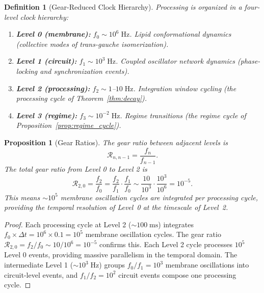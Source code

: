\documentclass[twocolumn,10pt]{article}
\newtheorem{proposition}[theorem]{Proposition}
\newtheorem{definition}[theorem]{Definition}
\theoremstyle{remark}
\begin{document}
\begin{definition}[Gear-Reduced Clock Hierarchy]
\label{def:clock}
Processing is organized in a four-level clock hierarchy:
\begin{enumerate}
\item \textbf{Level 0 (membrane):} $f_0 \sim 10^6\;\mathrm{Hz}$. Lipid conformational dynamics (collective modes of trans-gauche isomerization).
\item \textbf{Level 1 (circuit):} $f_1 \sim 10^3\;\mathrm{Hz}$. Coupled oscillator network dynamics (phase-locking and synchronization events).
\item \textbf{Level 2 (processing):} $f_2 \sim 1$--$10\;\mathrm{Hz}$. Integration window cycling (the processing cycle of Theorem~\ref{thm:decay}).
\item \textbf{Level 3 (regime):} $f_3 \sim 10^{-2}\;\mathrm{Hz}$. Regime transitions (the regime cycle of Proposition~\ref{prop:regime_cycle}).
\end{enumerate}
\end{definition}

\begin{proposition}[Gear Ratios]
\label{prop:gear}
The gear ratio between adjacent levels is
\begin{equation}
\mathcal{R}_{n,n-1} = \frac{f_n}{f_{n-1}}.
\label{eq:gear_ratio}
\end{equation}
The total gear ratio from Level 0 to Level 2 is
\begin{equation}
\mathcal{R}_{2,0} = \frac{f_2}{f_0} = \frac{f_2}{f_1} \cdot \frac{f_1}{f_0} \sim \frac{10}{10^3} \cdot \frac{10^3}{10^6} = 10^{-5}.
\label{eq:total_gear}
\end{equation}
This means $\sim 10^5$ membrane oscillation cycles are integrated per processing cycle, providing the temporal resolution of Level~0 at the timescale of Level~2.
\end{proposition}

\begin{proof}
Each processing cycle at Level 2 ($\sim 100\;\mathrm{ms}$) integrates $f_0 \times \Delta t = 10^6 \times 0.1 = 10^5$ membrane oscillation cycles. The gear ratio $\mathcal{R}_{2,0} = f_2/f_0 \sim 10/10^6 = 10^{-5}$ confirms this. Each Level 2 cycle processes $10^5$ Level 0 events, providing massive parallelism in the temporal domain. The intermediate Level 1 ($\sim 10^3\;\mathrm{Hz}$) groups $f_0/f_1 = 10^3$ membrane oscillations into circuit-level events, and $f_1/f_2 = 10^2$ circuit events compose one processing cycle.
\end{proof}
\end{document}

